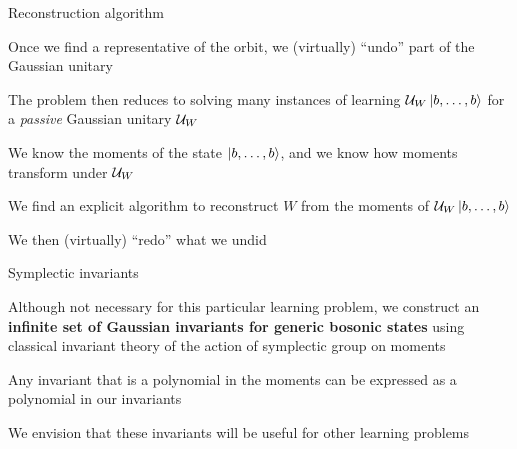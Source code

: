 \begin{frame}{Reconstruction algorithm}
  \begin{spaceditemize}
    \item Once we find a representative of the orbit, we (virtually) ``undo'' part of the Gaussian unitary
    \item The problem then reduces to solving many instances of learning \(\calU_W\ket{b,\dots,b}\) for a \emph{passive} Gaussian unitary \(\mathcal{U}_W\)
    \pause
    \item We know the moments of the state \(\ket{b,\dots,b}\), and we know how moments transform under \(\mathcal{U}_W\)
    \item We find an explicit algorithm to reconstruct \(W\) from the moments of \(\calU_W\ket{b,\dots,b}\)
    \pause
    \item We then (virtually) ``redo'' what we undid
  \end{spaceditemize}
\end{frame}


\begin{frame}{Symplectic invariants}
  \begin{spaceditemize}
    \item Although not necessary for this particular learning problem,
    we construct an \textbf{infinite set of Gaussian invariants for generic bosonic states} using classical invariant theory of the action of symplectic group on moments
    \item Any invariant that is a polynomial in the moments can be expressed as a polynomial in our invariants
    \pause
    \item We envision that these invariants will be useful for other learning problems
  \end{spaceditemize}
  \vfill
  \begin{center}
  \end{center}
\end{frame}


